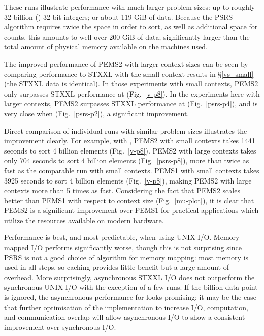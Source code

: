 \documentclass[12pt]{carletoncsthesis}
\begin{document}
These runs illustrate performance with much larger problem sizes: up to
roughly 32 billion () 32-bit integers; or about 119 GiB of data.
Because the PSRS algorithm requires twice the space in order to sort, as well
as additional space for counts, this amounts to well over 200 GiB of data;
significantly larger than the total amount of physical memory available on
the machines used.

The improved performance of PEMS2 with larger context sizes can be seen
by comparing performance to STXXL with the small context results in
\S\ref{vs_small} (the STXXL data is identical).  In those experiments
with small contexts, PEMS2 only surpasses STXXL performance at 
(Fig.~\ref{v-p8}).  In the experiments here with larger contexts, PEMS2
surpasses STXXL performance at  (Fig.~\ref{psrs-p4}), and is very close
when  (Fig.~\ref{psrs-p2}), a significant improvement.

Direct comparison of individual runs with similar problem sizes illustrates
the improvement clearly.  For example, with , PEMS2 with small
contexts takes 1441 seconds to sort 4 billion elements (Fig.~\ref{v-p8}).
PEMS2 with large contexts takes only 704 seconds to sort 4 billion elements
(Fig.~\ref{psrs-p8}), more than twice as fast as the comparable run with
small contexts.  PEMS1 with small contexts takes 3925 seconds to sort 4
billion elements (Fig.~\ref{v-p8}), making PEMS2 with large contexts more
than 5 times as fast.  Considering the fact that PEMS2 scales better than
PEMS1 with respect to context size (Fig.~\ref{mu-plot}), it is clear that
PEMS2 is a significant improvement over PEMS1 for practical applications
which utilize the resources available on modern hardware.

Performance is best, and most predictable, when using UNIX I/O.  Memory-mapped
I/O performs significantly worse, though this is not surprising since PSRS
is not a good choice of algorithm for memory mapping: most memory is used in
all steps, so caching provides little benefit but a large amount of overhead.
More surprisingly, asynchronous STXXL I/O does not outperform the synchronous
UNIX I/O with the exception of a few runs.  If the  billion data point
is ignored, the asynchronous performance for  looks promising; it may
be the case that further optimisation of the implementation to increase I/O,
computation, and communication overlap will allow asynchronous I/O to show
a consistent improvement over synchronous I/O.
\end{document}
